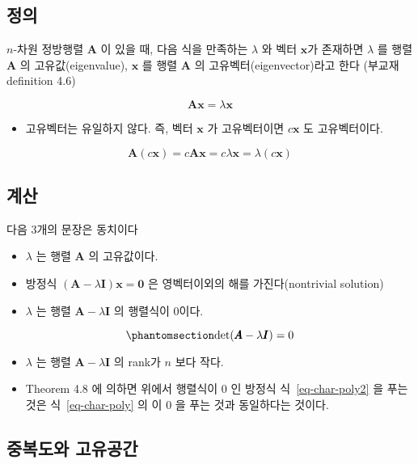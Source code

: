 \documentclass[
  11pt,
  a4paper,
  oneside]{scrbook}
\providecommand{\tightlist}{%
  \setlength{\itemsep}{0pt}\setlength{\parskip}{0pt}}\usepackage{longtable,booktabs,array}
\theoremstyle{definition}
\theoremstyle{plain}
\theoremstyle{definition}
\theoremstyle{definition}
\theoremstyle{remark}
\begin{document}
\subsection{정의}\label{uxc815uxc758}

\(n\)-차원 정방행렬 \(\pmb A\) 이 있을 때, 다음 식을 만족하는
\(\lambda\) 와 벡터 \(\pmb x\)가 존재하면 \(\lambda\) 를 행렬 \(\pmb A\)
의 고유값(eigenvalue), \(\pmb x\) 를 행렬 \(\pmb A\) 의
고유벡터(eigenvector)라고 한다 (부교재 definition 4.6)

\[ \pmb A \pmb x = \lambda \pmb x \]

\begin{itemize}
\tightlist
\item
  고유벡터는 유일하지 않다. 즉, 벡터 \(\pmb x\) 가 고유벡터이면
  \(c \pmb x\) 도 고유벡터이다.
\end{itemize}

\[ \pmb A (c \pmb x) = c \pmb A \pmb x = c \lambda \pmb x = \lambda (c \pmb x) \]

\subsection{계산}\label{uxacc4uxc0b0}

다음 3개의 문장은 동치이다

\begin{itemize}
\tightlist
\item
  \(\lambda\) 는 행렬 \(\pmb A\) 의 고유값이다.
\item
  방정식 \((\pmb A - \lambda \pmb I)\pmb x = \pmb 0\) 은 영벡터이외의
  해를 가진다(nontrivial solution)
\item
  \(\lambda\) 는 행렬 \(\pmb A - \lambda \pmb I\) 의 행렬식이 0이다.
\end{itemize}

\begin{equation}\phantomsection\label{eq-char-poly2}{ \operatorname{det}(\pmb A - \lambda \pmb I) = 0 }\end{equation}

\begin{itemize}
\item
  \(\lambda\) 는 행렬 \(\pmb A - \lambda \pmb I\) 의 rank가 \(n\) 보다
  작다.
\item
  Theorem 4.8 에 의하면 위에서 행렬식이 0 인 방정식
  식~\ref{eq-char-poly2} 을 푸는 것은 식~\ref{eq-char-poly} 의 이 0 을
  푸는 것과 동일하다는 것이다.
\end{itemize}

\subsection{중복도와
고유공간}\label{uxc911uxbcf5uxb3c4uxc640-uxace0uxc720uxacf5uxac04}
\end{document}
